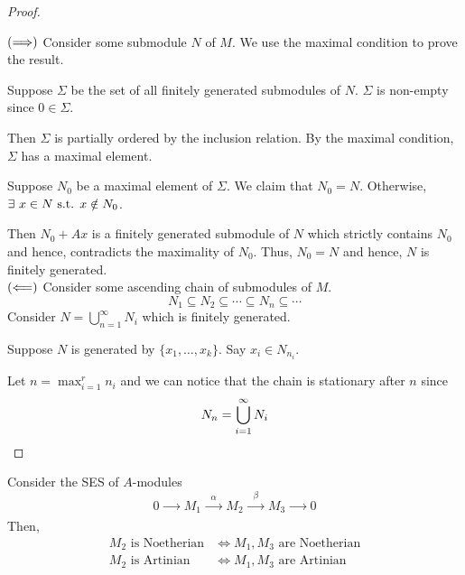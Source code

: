 \begin{proof} \

	\(\left( \Longrightarrow \right)\)
	Consider some submodule \(N\) of \(M\).
	We use the maximal condition to prove the result.

	Suppose \(\Sigma\) be the set of all finitely generated submodules
	of \(N\).
	\(\Sigma\) is non-empty since \(0 \in \Sigma\).

	Then \(\Sigma\) is partially ordered by the inclusion relation.
	By the maximal condition, \(\Sigma\) has a maximal element.

	Suppose \(N_0\) be a maximal element of \(\Sigma\).
	We claim that \(N_0 = N\).
	Otherwise, \(\exists\ x \in N \text{ s.t. } x \notin N_0\).

	Then \(N_0 + Ax\) is a finitely generated submodule of \(N\)
	which strictly contains \(N_0\) and hence, contradicts the maximality
	of \(N_0\).
	Thus, \(N_0 = N\) and hence, \(N\) is finitely generated. \\

	\(\left( \Longleftarrow \right)\)
	Consider some ascending chain of submodules of \(M\).
	\[
		N_1 \subseteq N_2 \subseteq \cdots \subseteq N_n \subseteq \cdots
	\]
	Consider \(N = \bigcup_{n=1}^\infty N_i\) which is finitely generated.

	Suppose \(N\) is generated by \(\{x_1, \ldots, x_k\}\).
	Say \(x_i \in N_{n_i}\).

	Let \(n = \max_{i=1}^r n_i\) and we can notice that the chain is
	stationary after \(n\) since
	\[
		N_n = \bigcup_{i=1}^{\infty} N_i \qedhere
	\]
\end{proof}


\begin{theorem}{}{}
	Consider the SES of \(A\)-modules
	\[
		0 \xrightarrow[\quad\quad]{} M_1 \xrightarrow[\quad\quad]{\alpha}
		M_2 \xrightarrow[\quad\quad]{\beta} M_3 \xrightarrow[\quad\quad]{} 0
	\]
	Then,
	\begin{align*}
		M_2 \text{ is Noetherian} &\iff M_1, M_3 \text{ are Noetherian} \\
		M_2 \text{ is Artinian} &\iff M_1, M_3 \text{ are Artinian}
	\end{align*}
\end{theorem}

